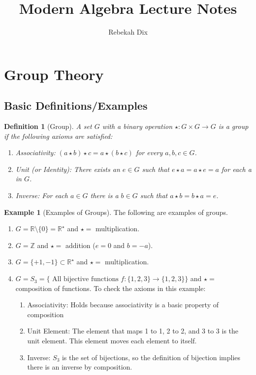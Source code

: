 \documentclass[12pt]{article}
\title{Modern Algebra Lecture Notes}
\author{Rebekah Dix}
\newtheorem{definition}{Definition}
\theoremstyle{definition}
\newtheorem{example}{Example}
\theoremstyle{definition}
\begin{document}
\maketitle
\tableofcontents
\newpage 

\section{Group Theory}
\subsection{Basic Definitions/Examples}
\begin{definition}[Group]
A set $G$ with a binary operation $\star: G \times G \rightarrow G$ is a group if the following axioms are satisfied:
\begin{enumerate} 
\item Associativity: $(a \star b) \star c = a \star (b \star c)$ for every $a,b,c \in G$.
\item Unit (or Identity): There exists an $e \in G$ such that $e \star a = a \star e = a$ for each a in $G$.
\item Inverse: For each $a \in G$ there is a $b \in G$ such that $a \star b = b \star a = e$. 
\end{enumerate} 
\end{definition}

\begin{example}[Examples of Groups] 
The following are examples of groups.
\begin{enumerate}
\item $G = \mathbb{R} \setminus \{ 0 \} = \mathbb{R}^{\star}$ and $\star = $ multiplication. 
\item $G = \mathbb{Z}$ and $\star = $ addition ($e=0$ and $b=-a$).
\item $G = \{ +1, -1 \} \subset \mathbb{R}^{\star}$ and $\star = $ multiplication. 
\item $G = S_3 = \{ \text{ All bijective functions } f: \{1,2,3\} \rightarrow \{1,2,3\} \}$ and $\star = $ composition of functions. To check the axioms in this example:
\begin{enumerate}
\item Associativity: Holds because associativity is a basic property of composition
\item Unit Element: The element that maps 1 to 1, 2 to 2, and 3 to 3 is the unit element. This element moves each element to itself. 
\item Inverse: $S_3$ is the set of bijections, so the definition of bijection implies there is an inverse by composition.
\end{enumerate}
\end{enumerate}
\end{example}
\end{document}
